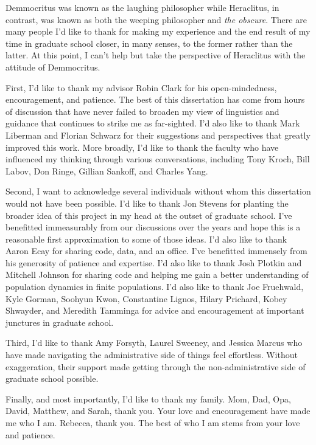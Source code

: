 \begin{singlespace}

Demmocritus was known as the laughing philosopher while Heraclitus, in contrast, was known as both the weeping philosopher  and \emph{the obscure}. There are many people I'd like to thank for making my experience and the end result of my time in graduate school closer, in many senses, to the former rather than the latter.  At this point, I can't help but take the perspective of Heraclitus with the attitude of Demmocritus.

First, I'd like to thank my advisor Robin Clark for his open-mindedness, encouragement, and patience. The best of this dissertation has come from hours of discussion that have never failed to broaden my view of linguistics and guidance that continues to strike me as far-sighted. I'd also like to thank Mark Liberman and Florian Schwarz for their suggestions and perspectives that greatly improved this work. More broadly, I'd like to thank the faculty who have influenced my thinking through various conversations, including Tony Kroch, Bill Labov, Don Ringe, Gillian Sankoff, and Charles Yang.

Second, I want to acknowledge several individuals without whom this dissertation would not have been possible. I'd like to thank Jon Stevens for planting the broader idea of this project in my head at the outset of graduate school. I've benefitted immeasurably from our discussions over the years and hope this is a reasonable first approximation to some of those ideas. I'd also like to thank Aaron Ecay for sharing code, data, and an office. I've benefitted immensely from his generosity of patience and expertise. I'd also like to thank Josh Plotkin and Mitchell Johnson for sharing code and helping me gain a better understanding of population dynamics in finite populations. I'd also like to thank Joe Fruehwald, Kyle Gorman, Soohyun Kwon, Constantine Lignos,  Hilary Prichard, Kobey Shwayder, and Meredith Tamminga for advice and encouragement at important junctures in graduate school. 

Third, I'd like to thank  Amy Forsyth, Laurel Sweeney, and Jessica Marcus who have made navigating the administrative side of things feel effortless. Without exaggeration, their support made getting through the non-administrative side of graduate school possible.

Finally, and most importantly, I'd like to thank my family. Mom, Dad, Opa, David, Matthew, and Sarah, thank you. Your love and encouragement have made me who I am. Rebecca, thank you. The best of who I am stems from your love and patience.
 

\end{singlespace}
